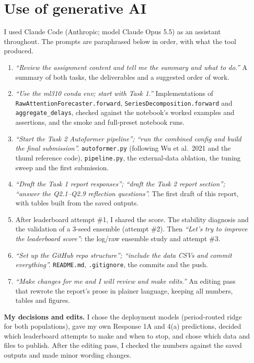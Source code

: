 \documentclass[11pt]{article}
\begin{document}
\section*{Use of generative AI}
I used Claude Code (Anthropic; model Claude Opus 5.5) as an assistant throughout. The prompts are
paraphrased below in order, with what the tool produced.
\begin{enumerate}
  \item \emph{``Review the assignment content and tell me the summary and what to do.''} A summary
  of both tasks, the deliverables and a suggested order of work.
  \item \emph{``Use the ml310 conda env; start with Task 1.''} Implementations of
  \texttt{RawAttentionForecaster.forward}, \texttt{SeriesDecomposition.forward} and
  \texttt{aggregate\_delays}, checked against the notebook's worked examples and assertions, and
  the smoke and full-preset notebook runs.
  \item \emph{``Start the Task 2 Autoformer pipeline''; ``run the combined config and build the
  final submission''.} \texttt{autoformer.py} (following Wu et al.\ 2021 and the thuml reference
  code), \texttt{pipeline.py}, the external-data ablation, the tuning sweep and the first
  submission.
  \item \emph{``Draft the Task 1 report responses''; ``draft the Task 2 report section''; ``answer
  the Q2.1--Q2.9 reflection questions''.} The first draft of this report, with tables built from
  the saved outputs.
  \item After leaderboard attempt \#1, I shared the score. The stability diagnosis and the
  validation of a 3-seed ensemble (attempt \#2). Then \emph{``Let's try to improve the leaderboard
  score''}: the log/raw ensemble study and attempt \#3.
  \item \emph{``Set up the GitHub repo structure''; ``include the data CSVs and commit everything''.}
  \texttt{README.md}, \texttt{.gitignore}, the commits and the push.
  \item \emph{``Make changes for me and I will review and make edits.''} An editing pass that
  rewrote the report's prose in plainer language, keeping all numbers, tables and figures.
\end{enumerate}
\textbf{My decisions and edits.} I chose the deployment models (period-routed ridge for both
populations), gave my own Response 1A and 4(a) predictions, decided which leaderboard attempts to
make and when to stop, and chose which data and files to publish. After the editing pass, I checked
the numbers against the saved outputs and made minor wording changes.
\end{document}
